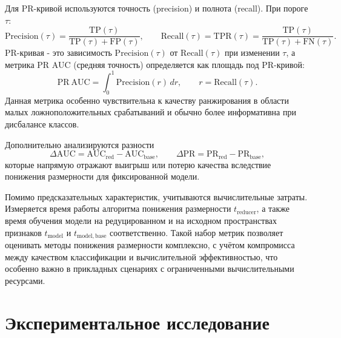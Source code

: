 \documentclass[12pt,a4paper]{article}
\begin{document}
Для PR-кривой используются точность (precision) и полнота (recall). При пороге $\tau$:
\begin{equation}
\mathrm{Precision}(\tau)=\frac{\mathrm{TP}(\tau)}{\mathrm{TP}(\tau)+\mathrm{FP}(\tau)},\qquad
\mathrm{Recall}(\tau)=\mathrm{TPR}(\tau)=\frac{\mathrm{TP}(\tau)}{\mathrm{TP}(\tau)+\mathrm{FN}(\tau)}.
\end{equation}
PR-кривая - это зависимость $\mathrm{Precision}(\tau)$ от $\mathrm{Recall}(\tau)$ при изменении $\tau$,
а метрика PR AUC (средняя точность) определяется как площадь под PR-кривой:
\begin{equation}
\mathrm{PR\ AUC}=\int_{0}^{1}\mathrm{Precision}(r)\,dr,
\qquad r=\mathrm{Recall}(\tau).
\end{equation}
Данная метрика особенно чувствительна к качеству ранжирования в области малых ложноположительных
срабатываний и обычно более информативна при дисбалансе классов.

Дополнительно анализируются разности
\[
\Delta \mathrm{AUC} = \mathrm{AUC}_{\mathrm{red}} - \mathrm{AUC}_{\mathrm{base}}, \qquad
\Delta \mathrm{PR} = \mathrm{PR}_{\mathrm{red}} - \mathrm{PR}_{\mathrm{base}},
\]
которые напрямую отражают выигрыш или потерю качества вследствие понижения размерности
для фиксированной модели.

Помимо предсказательных характеристик, учитываются вычислительные затраты.
Измеряется время работы алгоритма понижения размерности $t_{\mathrm{reducer}}$,
а также время обучения модели на редуцированном и на исходном пространствах признаков
$t_{\mathrm{model}}$ и $t_{\mathrm{model,base}}$ соответственно.
Такой набор метрик позволяет оценивать методы понижения размерности комплексно,
с учётом компромисса между качеством классификации и вычислительной эффективностью,
что особенно важно в прикладных сценариях с ограниченными вычислительными ресурсами.


\section{Экспериментальное исследование}
\end{document}
